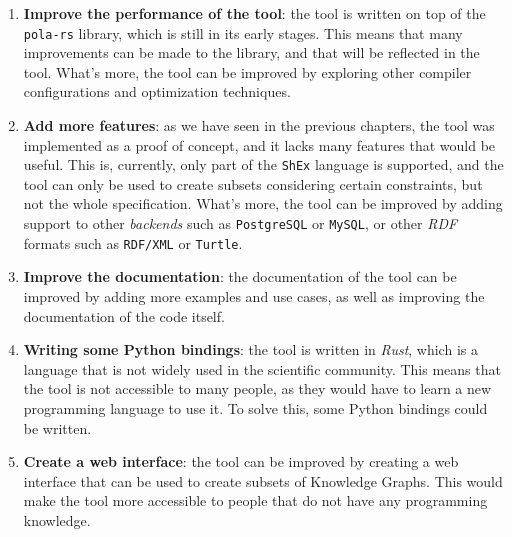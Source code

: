 \begin{enumerate}
    \itemsep0.5em
    \item \textbf{Improve the performance of the tool}: the tool is written on top of the \texttt{pola-rs} library, which is still in its early stages. This means that many improvements can be made to the library, and that will be reflected in the tool. What's more, the tool can be improved by exploring other compiler configurations and optimization techniques.
    \item \textbf{Add more features}: as we have seen in the previous chapters, the tool was implemented as a proof of concept, and it lacks many features that would be useful. This is, currently, only part of the \texttt{ShEx} language is supported, and the tool can only be used to create subsets considering certain constraints, but not the whole specification. What's more, the tool can be improved by adding support to other \textit{backends} such as \texttt{PostgreSQL} or \texttt{MySQL}, or other \textit{RDF} formats such as \texttt{RDF/XML} or \texttt{Turtle}.
    \item \textbf{Improve the documentation}: the documentation of the tool can be improved by adding more examples and use cases, as well as improving the documentation of the code itself.
    \item \textbf{Writing some Python bindings}: the tool is written in \textit{Rust}, which is a language that is not widely used in the scientific community. This means that the tool is not accessible to many people, as they would have to learn a new programming language to use it. To solve this, some Python bindings could be written.
    \item \textbf{Create a web interface}: the tool can be improved by creating a web interface that can be used to create subsets of Knowledge Graphs. This would make the tool more accessible to people that do not have any programming knowledge.
\end{enumerate}

